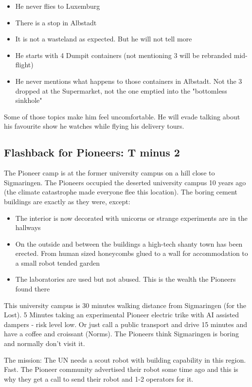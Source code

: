 \begin{itemize}
    \item He never flies to Luxemburg
    \item There is a stop in Albstadt
    \item It is not a wasteland as expected. But he will not tell more
    \item He starts with 4 Dumpit containers (not mentioning 3 will be rebranded mid-flight)
    \item He never mentions what happens to those containers in Albstadt. Not the 3 dropped at the Supermarket, not the one emptied into the "bottomless sinkhole"
\end{itemize}

Some of those topics make him feel uncomfortable. He will evade talking about his favourite show he watches while flying his delivery tours.


\subsection{Flashback for Pioneers: T minus 2}

The Pioneer camp is at the former university campus on a hill close to Sigmaringen. The Pioneers occupied the deserted university campus 10 years ago (the climate catastrophe made everyone flee this location). The boring cement buildings are exactly as they were, except:

\begin{itemize}
    \item The interior is now decorated with unicorns or strange experiments are in the hallways
    \item On the outside and between the buildings a high-tech shanty town has been erected. From human sized honeycombs glued to a wall for accommodation to a small robot tended garden
    \item The laboratories are used but not abused. This is the wealth the Pioneers found there
\end{itemize}

This university campus is 30 minutes walking distance from Sigmaringen (for the Lost). 5 Minutes taking an experimental Pioneer electric trike with AI assisted dampers - risk level low. Or just call a public transport and drive 15 minutes and have a coffee and croissant (Norms).
The Pioneers think Sigmaringen is boring and normally don't visit it.

The mission: The UN needs a scout robot with building capability in this region. Fast. The Pioneer community advertised their robot some time ago and this is why they get a call to send their robot and 1-2 operators for it.

